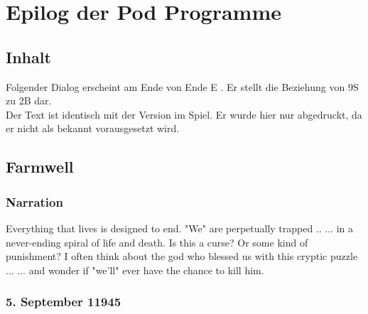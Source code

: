 
\newpage


\chapter{Epilog der Pod Programme}

\section{Inhalt}
Folgender Dialog erscheint am Ende von \dq Ende E \dq .  Er stellt die Beziehung von 9S zu 2B dar. 	\\
 Der Text ist identisch mit der Version im Spiel. Er wurde hier nur abgedruckt, da er nicht als bekannt vorausgesetzt wird. 


\section{Farmwell}
\subsection{Narration}

\begin{play}
	  Everything that lives is designed to end.
	  "We" are perpetually trapped ..
	  ... in a never-ending spiral of life and death.
	  Is this a curse?
	  Or some kind of punishment?
	   I often think about the god who blessed us with this cryptic puzzle ...
	  ... and wonder if "we'll" ever have the chance to kill him.
\end{play}

\subsection{5. September 11945}

